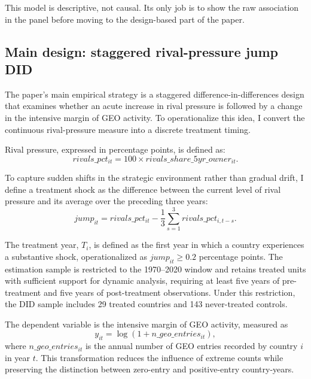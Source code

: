 \documentclass[11pt]{article}
\begin{document}
This model is descriptive, not causal. Its only job is to show the raw association in the panel before moving to the design-based part of the paper.

\subsection{Main design: staggered rival-pressure jump DID}

The paper's main empirical strategy is a staggered difference-in-differences design that examines whether an acute increase in rival pressure is followed by a change in the intensive margin of GEO activity. To operationalize this idea, I convert the continuous rival-pressure measure into a discrete treatment timing.

Rival pressure, expressed in percentage points, is defined as:
\begin{equation}
    rivals\_pct_{it} = 100 \times rivals\_share\_5yr\_owner_{it}.
\end{equation}

To capture sudden shifts in the strategic environment rather than gradual drift, I define a treatment shock as the difference between the current level of rival pressure and its average over the preceding three years:
\begin{equation}
    jump_{it} = rivals\_pct_{it} - \frac{1}{3}\sum_{s=1}^{3} rivals\_pct_{i,t-s}.
\end{equation}

The treatment year, $T_i$, is defined as the first year in which a country experiences a substantive shock, operationalized as $jump_{it} \geq 0.2$ percentage points. The estimation sample is restricted to the 1970--2020 window and retains treated units with sufficient support for dynamic analysis, requiring at least five years of pre-treatment and five years of post-treatment observations. Under this restriction, the DID sample includes 29 treated countries and 143 never-treated controls.

The dependent variable is the intensive margin of GEO activity, measured as
\begin{equation}
    y_{it} = \log(1 + n\_geo\_entries_{it}),
\end{equation}
where $n\_geo\_entries_{it}$ is the annual number of GEO entries recorded by country $i$ in year $t$. This transformation reduces the influence of extreme counts while preserving the distinction between zero-entry and positive-entry country-years.
\end{document}
